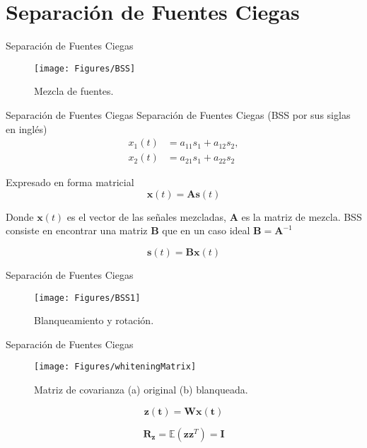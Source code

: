 \documentclass[10pt]{beamer}
\newcommand{\mat}[1] {\mathbf{#1}}
\newcommand{\vect}[1]{\mathbf{#1}}
\begin{document}
\section{Separación de Fuentes Ciegas}

\begin{frame}{Separación de Fuentes Ciegas}
\begin{figure}[h]
\centering
\texttt{[image: Figures/BSS]}
\caption{Mezcla de fuentes.}
\label{BSS}
\end{figure}
\end{frame}

\begin{frame}{Separación de Fuentes Ciegas}
Separación de Fuentes Ciegas (BSS por sus siglas en inglés)
\begin{equation}
\begin{split}
x_{1}(t) &= a_{11}s_{1}+a_{12}s_{2}, \\
x_{2}(t) &= a_{21}s_{1}+a_{22}s_{2}
\end{split}
\end{equation}  

Expresado en forma matricial 
\begin{equation}
\vect{x}(t) = \mat{A}\vect{s}(t)
\end{equation}

\noindent Donde $\vect{x}(t)$ es el vector de las señales mezcladas, $\mat{A}$ es la matriz de mezcla. BSS consiste en encontrar una matriz $\mat{B}$ que en un caso ideal $\mat{B}=\mat{A}^{-1}$ 

\begin{equation}
\vect{s}(t) = \mat{B}\vect{x}(t)
\end{equation}

\end{frame}

\begin{frame}{Separación de Fuentes Ciegas}
\begin{figure}[h]
\centering
\texttt{[image: Figures/BSS1]}
\caption{Blanqueamiento y rotación.}
\label{BSS1}
\end{figure}

\end{frame}



\begin{frame}{Separación de Fuentes Ciegas}
\begin{figure}[ht]
\centering
\texttt{[image: Figures/whiteningMatrix]}
\caption{Matriz de covarianza (a) original (b) blanqueada.}
\label{whiteningMatrix}
\end{figure}

\begin{equation}
\vect{z(t)} = \mat{W}\vect{x(t)}
\end{equation}


\begin{equation}
\mat{R_z}= \mathbb{E}\left(\vect{z}\vect{z}^T\right)=\mat{I}
\end{equation}



\end{frame}
\end{document}

